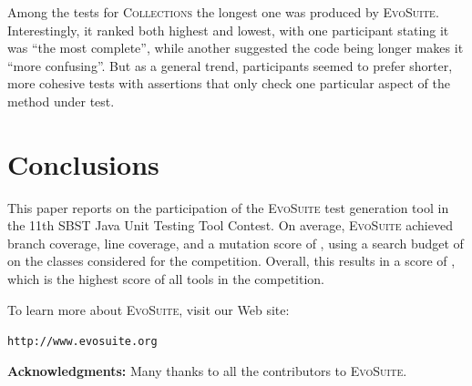 \documentclass[10pt,conference]{IEEEtran}
\newcommand{\project}[1]{\textsc{#1}\xspace}
\newcommand{\Collections}{\project{Collections}}
\newcommand{\EVOSUITE}{\textsc{EvoSuite}\xspace}
\begin{document}
Among the tests for \Collections the longest one was produced by \EVOSUITE.
Interestingly, it ranked both highest and lowest, with one participant
stating it was ``the most complete'', while another suggested the code
being longer makes it ``more confusing''. But as a general trend, participants
seemed to prefer shorter, more cohesive tests with assertions that only check
one particular aspect of the method under test.

\section{Conclusions}

This paper reports on the participation of the \EVOSUITE test generation tool
in the 11th SBST Java Unit Testing Tool Contest. On average, \EVOSUITE
achieved \avgConditionsCoverageRatioLong branch coverage,
\avgLinesCoverageRatioLong line coverage, and a mutation score of
\avgMutantsCoverageRatioLong, using a search budget of \budgetLong on the \cuts
classes considered for the competition. Overall, this results in a score of
\score, which is the highest score of all tools in the competition.


To learn more about \EVOSUITE, visit our Web site:
\begin{center}
\texttt{http://www.evosuite.org}
\end{center}



\textbf{Acknowledgments:} Many thanks to all the contributors to
\EVOSUITE.




\balance
\end{document}
